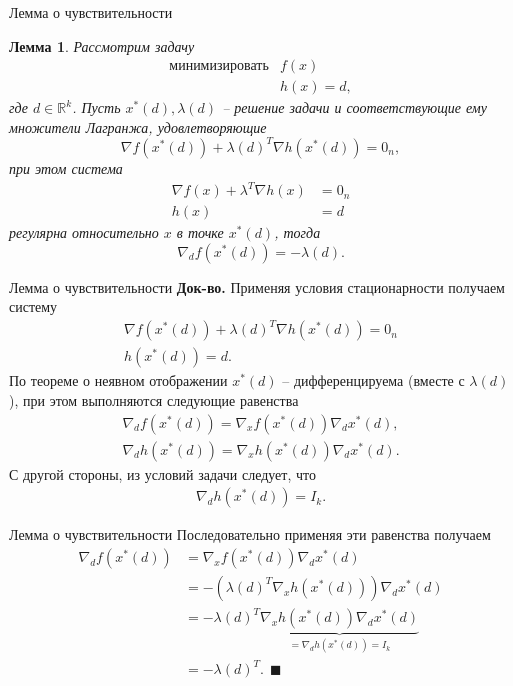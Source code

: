 \documentclass[10pt]{beamer}
\newtheorem{lemma_ru}{Лемма}[]
\begin{document}
\begin{frame}{Лемма о чувствительности}
\begin{lemma_ru}
Рассмотрим задачу
$$
\begin{array}{ll}
\mbox{минимизировать} & f(x) \\
 & h(x)=d,
\end{array}
$$
где $d\in \mathbb{R}^k$. Пусть $x^*(d), \lambda(d)$ -- решение задачи и соответствующие ему множители Лагранжа, удовлетворяющие
$$
\nabla f(x^*(d))+\lambda(d)^T \nabla h(x^*(d))=0_n,
$$
при этом система
\begin{align*}
\nabla f(x)+\lambda^T \nabla h(x)&=0_n\\
h(x)&=d
\end{align*}
регулярна относительно $x$ в точке $x^*(d)$, тогда
$$
\nabla_d f(x^*(d)) = -\lambda(d).
$$
\end{lemma_ru}

\end{frame}

\begin{frame}{Лемма о чувствительности}
\textbf{Док-во.} Применяя условия стационарности получаем систему
\begin{align*}
\nabla f (x^*(d)) + \lambda(d)^T \nabla h(x^*(d))=0_n \\
h(x^*(d)) = d.
\end{align*}
\pause
По теореме о неявном отображении $x^*(d)$ -- дифференцируема (вместе с $\lambda(d)$), при этом выполняются следующие равенства
\begin{align*}
\nabla_d f(x^*(d))=\nabla_x f(x^*(d))\nabla_d x^*(d),\\
\nabla_d h(x^*(d))=\nabla_x h(x^*(d))\nabla_d x^*(d).
\end{align*}
\pause
С другой стороны, из условий задачи следует, что
\begin{align*}
\nabla_d h(x^*(d))=I_k.
\end{align*}
\end{frame}

\begin{frame}{Лемма о чувствительности}
Последовательно применяя эти равенства получаем
\begin{align*}
\nabla_d f(x^*(d)) &= \nabla_x f(x^*(d))\nabla_d x^*(d) \\ 
&=-(\lambda(d)^T\nabla_x h(x^*(d)))\nabla_d x^*(d)\\
&=-\lambda(d)^T\underbrace{\nabla_x h(x^*(d))\nabla_dx^*(d)}_{=\nabla_dh(x^*(d))= I_k}\\
&=-\lambda(d)^T.~~\blacksquare
\end{align*}
\end{frame}
\end{document}
